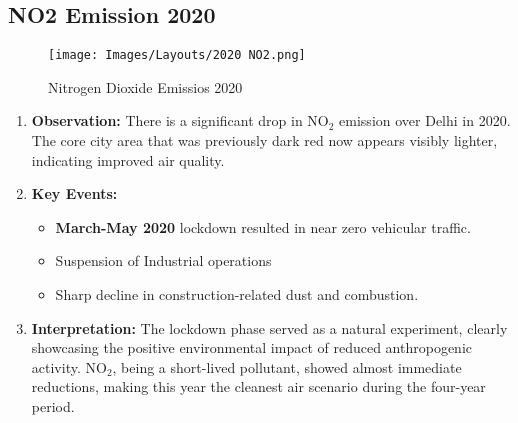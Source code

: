 \documentclass[12pt]{report}
\begin{document}
\subsection{NO2 Emission 2020}
\begin{figure}[H]
    \centering
    \texttt{[image: Images/Layouts/2020 NO2.png]}
    \caption{Nitrogen Dioxide Emissios 2020}  
\end{figure}
\begin{enumerate}
    \item \textbf{Observation:}
    There is a significant drop in NO$_2$ emission over Delhi in 2020. The core city area that was previously dark red now appears visibly lighter, indicating improved air quality.
    \item \textbf{Key Events:}
    \begin{itemize}
        \item \textbf{March-May 2020} lockdown resulted in near zero vehicular traffic.
        \item Suspension of Industrial operations
        \item Sharp decline in construction-related dust and combustion.
    \end{itemize}
    \item \textbf{Interpretation:}
    The lockdown phase served as a natural experiment, clearly showcasing the positive environmental impact of reduced anthropogenic activity. NO$_2$, being a short-lived pollutant, showed almost immediate reductions, making this year the cleanest air scenario during the four-year period.
\end{enumerate}
\end{document}

